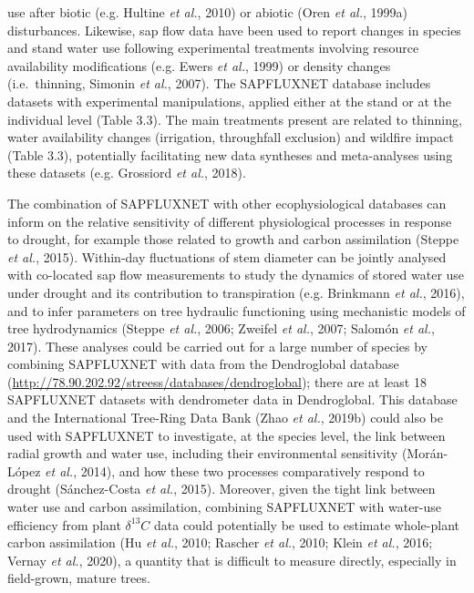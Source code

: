 \documentclass[11pt,twoside]{reedthesis}
\begin{document}
use after biotic (e.g. Hultine \emph{et al.}, 2010) or abiotic (Oren
\emph{et al.}, 1999a) disturbances. Likewise, sap flow data have been
used to report changes in species and stand water use following
experimental treatments involving resource availability modifications
(e.g. Ewers \emph{et al.}, 1999) or density changes (i.e.~thinning,
Simonin \emph{et al.}, 2007). The SAPFLUXNET database includes datasets
with experimental manipulations, applied either at the stand or at the
individual level (Table 3.3). The main treatments present are related to
thinning, water availability changes (irrigation, throughfall exclusion)
and wildfire impact (Table 3.3), potentially facilitating new data
syntheses and meta-analyses using these datasets (e.g. Grossiord
\emph{et al.}, 2018).\par

The combination of SAPFLUXNET with other ecophysiological databases can
inform on the relative sensitivity of different physiological processes
in response to drought, for example those related to growth and carbon
assimilation (Steppe \emph{et al.}, 2015). Within-day fluctuations of
stem diameter can be jointly analysed with co-located sap flow
measurements to study the dynamics of stored water use under drought and
its contribution to transpiration (e.g. Brinkmann \emph{et al.}, 2016),
and to infer parameters on tree hydraulic functioning using mechanistic
models of tree hydrodynamics (Steppe \emph{et al.}, 2006; Zweifel
\emph{et al.}, 2007; Salomón \emph{et al.}, 2017). These analyses could
be carried out for a large number of species by combining SAPFLUXNET
with data from the Dendroglobal database
(\url{http://78.90.202.92/streess/databases/dendroglobal}); there are at
least 18 SAPFLUXNET datasets with dendrometer data in Dendroglobal. This
database and the International Tree-Ring Data Bank (Zhao \emph{et al.},
2019b) could also be used with SAPFLUXNET to investigate, at the species
level, the link between radial growth and water use, including their
environmental sensitivity (Morán-López \emph{et al.}, 2014), and how
these two processes comparatively respond to drought (Sánchez-Costa
\emph{et al.}, 2015). Moreover, given the tight link between water use
and carbon assimilation, combining SAPFLUXNET with water-use efficiency
from plant \(\delta^{13}C\) data could potentially be used to estimate
whole-plant carbon assimilation (Hu \emph{et al.}, 2010; Rascher
\emph{et al.}, 2010; Klein \emph{et al.}, 2016; Vernay \emph{et al.},
2020), a quantity that is difficult to measure directly, especially in
field-grown, mature trees.\par
\end{document}
